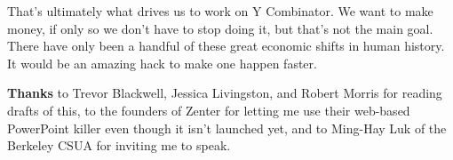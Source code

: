 That's ultimately what drives us to work on Y Combinator. We want to
make money, if only so we don't have to stop doing it, but that's not
the main goal. There have only been a handful of these great economic
shifts in human history. It would be an amazing hack to make one happen
faster.


\textbf{Thanks} to Trevor Blackwell, Jessica Livingston, and Robert
Morris for reading drafts of this, to the founders of Zenter for letting
me use their web-based PowerPoint killer even though it isn't launched
yet, and to Ming-Hay Luk of the Berkeley CSUA for inviting me to speak.